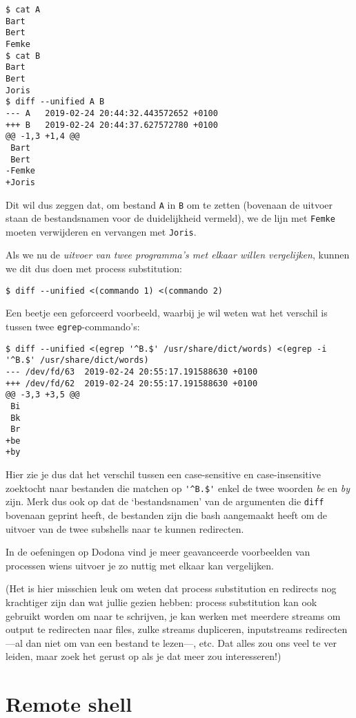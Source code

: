 \documentclass[a4paper,twoside,openany]{memoir}
\begin{document}
\begin{verbatim}
$ cat A
Bart
Bert
Femke
$ cat B
Bart
Bert
Joris
$ diff --unified A B
--- A   2019-02-24 20:44:32.443572652 +0100
+++ B   2019-02-24 20:44:37.627572780 +0100
@@ -1,3 +1,4 @@
 Bart
 Bert
-Femke
+Joris
\end{verbatim}

Dit wil dus zeggen dat, om bestand \verb!A! in \verb!B! om te zetten (bovenaan
de uitvoer staan de bestandsnamen voor de duidelijkheid vermeld), we de lijn
met \verb!Femke! moeten verwijderen en vervangen met \verb!Joris!.

Als we nu de \emph{uitvoer van twee programma's met elkaar willen vergelijken},
kunnen we dit dus doen met process substitution:
\begin{verbatim}
$ diff --unified <(commando 1) <(commando 2)
\end{verbatim}

Een beetje een geforceerd voorbeeld, waarbij je wil weten wat het verschil is
tussen twee \verb!egrep!-commando's:

\begin{verbatim}
$ diff --unified <(egrep '^B.$' /usr/share/dict/words) <(egrep -i '^B.$' /usr/share/dict/words)
--- /dev/fd/63  2019-02-24 20:55:17.191588630 +0100
+++ /dev/fd/62  2019-02-24 20:55:17.191588630 +0100
@@ -3,3 +3,5 @@
 Bi
 Bk
 Br
+be
+by
\end{verbatim}

Hier zie je dus dat het verschil tussen een case-sensitive en case-insensitive
zoektocht naar bestanden die matchen op \verb!'^B.$'! enkel de twee woorden
\emph{be} en \emph{by} zijn. Merk dus ook op dat de `bestandsnamen' van de
argumenten die \verb!diff! bovenaan geprint heeft, de bestanden zijn die bash
aangemaakt heeft om de uitvoer van de twee subshells naar te kunnen redirecten.

In de oefeningen op Dodona vind je meer geavanceerde voorbeelden van processen
wiens uitvoer je zo nuttig met elkaar kan vergelijken.

(Het is hier misschien leuk om weten dat process substitution en redirects nog
krachtiger zijn dan wat jullie gezien hebben: process substitution kan ook
gebruikt worden om naar te schrijven, je kan werken met meerdere streams om
output te redirecten naar files, zulke streams dupliceren, inputstreams
redirecten---al dan niet om van een bestand te lezen---, etc. Dat alles zou ons
veel te ver leiden, maar zoek het gerust op als je dat meer zou interesseren!)

\chapter{Remote shell}
\end{document}
